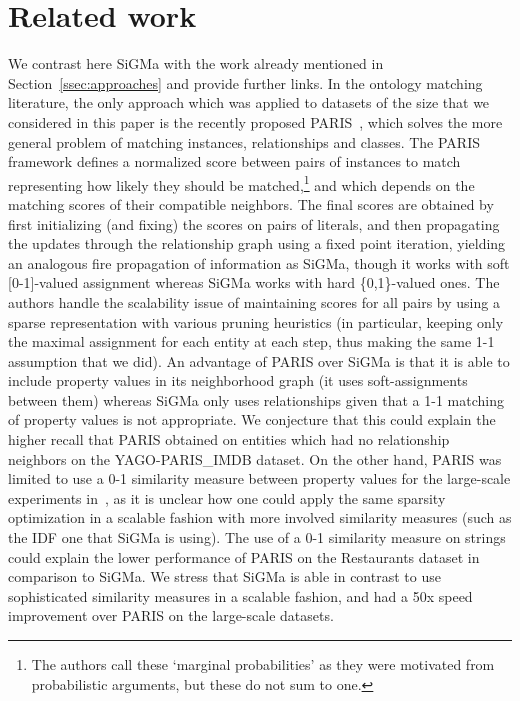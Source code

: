 \documentclass{sig-alternate}
\newcommand{\ts}[1]{\textsf{#1}}
\begin{document}
%
%
%
%
%
%
%
%
%
%
%

\section{Related work} \label{sec:related}
We contrast here \ts{SiGMa} with the work already mentioned in Section~\ref{ssec:approaches} and provide further links. In the ontology matching literature, the only approach which was applied to datasets of the size that we considered in this paper is the recently proposed \ts{PARIS}~\cite{suchanek12PARIS}, which solves the more general problem of matching instances, relationships and classes. The \ts{PARIS} framework defines a normalized score between pairs of instances to match representing how likely they should be matched,\footnote{The authors call these `marginal probabilities' as they were motivated from probabilistic arguments, but these do not sum to one.} and which depends on the matching scores of their compatible neighbors. The final scores are obtained by first initializing (and fixing) the scores on pairs of literals, and then propagating the updates through the relationship graph using a fixed point iteration, yielding an analogous fire propagation of information as \ts{SiGMa}, though it works with soft [0-1]-valued assignment whereas \ts{SiGMa} works with hard \{0,1\}-valued ones. The authors handle the scalability issue of maintaining scores for all pairs by using a sparse representation with various pruning heuristics (in particular, keeping only the maximal assignment for each entity at each step, thus making the same 1-1 assumption that we did).  An advantage of \ts{PARIS} over \ts{SiGMa} is that it is able to include property values in its neighborhood graph (it uses soft-assignments between them) whereas \ts{SiGMa} only uses relationships given that a 1-1 matching of property values is not appropriate. We conjecture that this could explain the higher recall that \ts{PARIS} obtained on entities which had no relationship neighbors on the \ts{YAGO}-\ts{PARIS\_IMDB} dataset. On the other hand, \ts{PARIS} was limited to use a 0-1 similarity measure between property values for the large-scale experiments in~\cite{suchanek12PARIS}, as it is unclear how one could apply the same sparsity optimization in a scalable fashion with more involved similarity measures (such as the IDF one that \ts{SiGMa} is using). The use of a 0-1 similarity measure on strings could explain the lower performance of \ts{PARIS} on the Restaurants dataset in comparison to \ts{SiGMa}. We stress that \ts{SiGMa} is able in contrast to use sophisticated similarity measures in a scalable fashion, and had a 50x speed improvement over \ts{PARIS} on the large-scale datasets.
\end{document}
